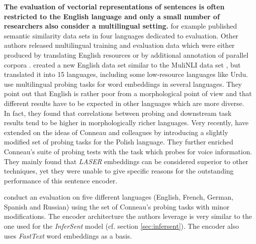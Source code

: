 \textbf{The evaluation of vectorial representations of sentences is often restricted to the English language and only a small number of researchers also consider a multilingual setting.} \citep{Cer.2017} for example published semantic similarity data sets in four languages dedicated to evaluation. Other authors released multilingual training and evaluation data which were either produced by translating English resources \citep{Agic.2017,Mehdad.2011} or by additional annotation of parallel corpora \citep{Negri.2011}. \citep{Conneau.2018c} created a new English data set similar to the MuliNLI data set \citep{Williams.2018}, but translated it into 15 languages, including some low-resource languages like Urdu. \citep{Sahin.2019} use multilingual probing tasks for word embeddings in  several languages. They point out that English is rather poor from a morphological point of view and that different results have to be expected in other languages which are more diverse. In fact, they found that correlations between probing and downstream task results tend to be higher in morphologically richer languages. Very recently, \citep{Krasnowska.2019} have extended on the ideas of Conneau and colleagues by introducing a slightly modified set of probing tasks for the Polish language. They further enriched Conneau's suite of probing tests with the  task which probes for voice information. They mainly found that \textit{LASER} embeddings can be considered superior to other techniques, yet they were unable to give specific reasons for the outstanding performance of this sentence encoder.

\citep{Ravishankar.2019} conduct an evaluation on five different languages (English, French, German, Spanish and Russian) using the set of Conneau's probing tasks with minor modifications. The encoder architecture the authors leverage is very similar to the one used for the \textit{InferSent} model (cf. section \vref{sec:infersent}). The encoder also uses \textit{FastText} word embeddings as a basis.

